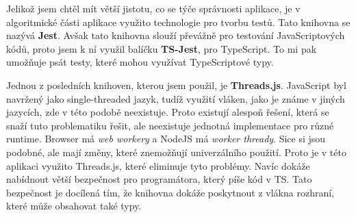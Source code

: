 Jelikož jsem chtěl mít větší jistotu, co se týče správnosti aplikace, je v algoritmické části aplikace využito technologie pro tvorbu testů. 
Tato knihovna se nazývá \textbf{Jest}\cite{Jest_RSS}.
Avšak tato knihovna slouží převážně pro testování JavaScriptových kódů, proto jsem k ní využil balíčku \textbf{TS-Jest}\cite{Kabra_2016}, pro TypeScript.
To mi pak umožňuje psát testy, které mohou využívat TypeScriptové typy.

Jednou z posledních knihoven, kterou jsem použil, je \textbf{Threads.js}\cite{Wermke_2019}. 
JavaScript byl navržený jako single-threaded jazyk, tudíž využití vláken, jako je známe v jiných jazycích, zde v této podobě neexistuje.
Proto existují alespoň řešení, která se snaží tuto problematiku řešit, ale neexistuje jednotná implementace pro různé runtime.
Browser má \textit{web workery} a NodeJS má \textit{worker thready}.
Sice si jsou podobné, ale mají změny, které znemožňují univerzálního použití.
Proto je v této aplikaci využito Threads.js, které eliminuje tyto problémy.
Navíc dokáže nabídnout větší bezpečnost pro programátora, který píše kód v TS. 
Tato bezpečnost je docílená tím, že knihovna dokáže poskytnout z vlákna rozhraní, které může obsahovat také typy.

\endinput